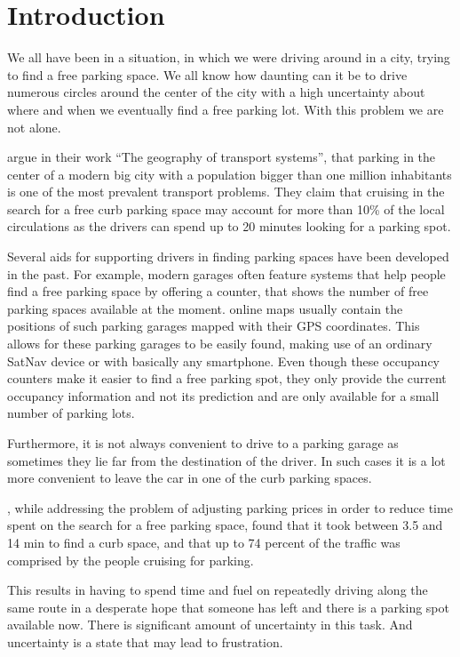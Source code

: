 \chapter{Introduction} %
\label{cha:introduction}

We all have been in a situation, in which we were driving around in a city,
trying to find a free parking space. We all know how daunting can it be to
drive numerous circles around the center of the city with a high uncertainty
about where and when we eventually find a free parking lot. With this problem
we are not alone.

\citet{rodrigue2013geography} argue in their work ``The geography of transport
systems'', that parking in the center of a modern big city with a population
bigger than one million inhabitants is one of the most prevalent transport
problems. They claim that cruising in the search for a free curb parking space
may account for more than 10\% of the local circulations as the drivers can
spend up to 20 minutes looking for a parking spot.

Several aids for supporting drivers in finding parking spaces have been
developed in the past. For example, modern garages often feature systems that
help people find a free parking space by offering a counter, that shows the
number of free parking spaces available at the moment. online maps usually
contain the positions of such parking garages mapped with their GPS
coordinates. This allows for these parking garages to be easily found, making
use of an ordinary SatNav device or with basically any smartphone. Even though
these occupancy counters make it easier to find a free parking spot, they only
provide the current occupancy information and not its prediction and are only
available for a small number of parking lots.

Furthermore, it is not always convenient to drive to a parking garage as
sometimes they lie far from the destination of the driver. In such cases it is
a lot more convenient to leave the car in one of the curb parking spaces.

\citet{shoup2006cruising}, while addressing the problem of adjusting parking
prices in order to reduce time spent on the search for a free parking space,
found that it took between 3.5 and 14 min to find a curb space, and that up to
74 percent of the traffic was comprised by the people cruising for parking.

This results in having to spend time and fuel on repeatedly driving along the
same route in a desperate hope that someone has left and there is a parking
spot available now. There is significant amount of uncertainty in this task.
And uncertainty is a state that may lead to frustration.

